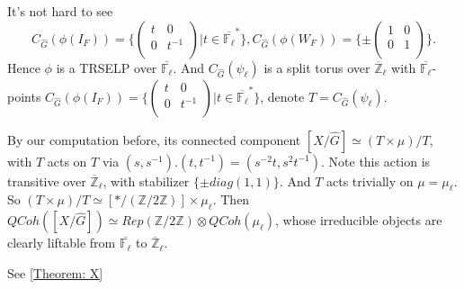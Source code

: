 \documentclass{article}
\newcommand{\red}[1]{\textcolor{red}{#1}}
\newtheorem*{remark}{Remark}
\begin{document}
	It's not hard to see 
	$$C_{\hat{G}}(\phi(I_F))=\{\begin{pmatrix} 
		t & 0 \\
		0 & t^{-1} \\
	\end{pmatrix}| t \in \overline{\mathbb{F}_{\ell}}^*\},
	C_{\hat{G}}(\phi(W_F))=\{\pm\begin{pmatrix} 
		1 & 0 \\
		0 & 1 \\
	\end{pmatrix}\}.$$
	Hence $\phi$ is a TRSELP over $\overline{\mathbb{F}_{\ell}}$. And $C_{\hat{G}}(\psi_{\ell})$ is a split torus over $\overline{\mathbb{Z}}_{\ell}$ with $\overline{\mathbb{F}_{\ell}}$-points $C_{\hat{G}}(\phi(I_F))=\{\begin{pmatrix} 
		t & 0 \\
		0 & t^{-1} \\
	\end{pmatrix}| t \in \overline{\mathbb{F}_{\ell}}^*\}$, denote $T=C_{\hat{G}}(\psi_{\ell})$.
	
	By our computation before, its connected component $[X/\hat{G}] \simeq (T \times \mu)/T$, with $T$ acts on $T$ via $(s, s^{-1}).(t, t^{-1})=(s^{-2}t, s^2t^{-1})$. Note this action is transitive over $\overline{\mathbb{Z}}_{\ell}$, with stabilizer $\{\pm{diag(1, 1)}\}$. And $T$ acts trivially on $\mu=\mu_{\ell}$. So $(T \times \mu)/T \simeq [*/(\mathbb{Z}/2\mathbb{Z})] \times \mu_{\ell}.$ Then $QCoh([X/\hat{G}]) \simeq Rep(\mathbb{Z}/2\mathbb{Z}) \otimes QCoh(\mu_{\ell})$, whose irreducible objects are clearly liftable from $\overline{\mathbb{F}_{\ell}}$ to $\overline{\mathbb{Z}}_{\ell}$.
	
	See \ref{Theorem: X}
	
\end{document}
